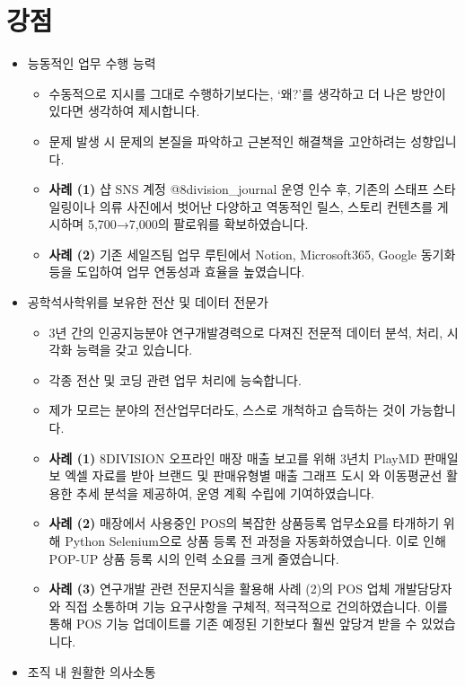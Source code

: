 \documentclass[a4paper,10pt]{extarticle}
\begin{document}
\section*{강점}
\begin{itemize}
	\item 능동적인 업무 수행 능력
	      \begin{itemize}
		      \item 수동적으로 지시를 그대로 수행하기보다는, ‘왜?’를 생각하고 더 나은 방안이 있다면 생각하여 제시합니다.
		      \item 문제 발생 시 문제의 본질을 파악하고 근본적인 해결책을 고안하려는 성향입니다.
		      \item \textbf{사례 (1)} 샵 SNS 계정 @8division\_journal 운영 인수 후, 기존의 스태프 스타일링이나 의류 사진에서 벗어난 다양하고 역동적인 릴스, 스토리 컨텐츠를 게시하며 5,700→7,000의 팔로워를 확보하였습니다.
		      \item \textbf{사례 (2)} 기존 세일즈팀 업무 루틴에서 Notion, Microsoft365, Google 동기화 등을 도입하여 업무 연동성과 효율을 높였습니다.
	      \end{itemize}
	\item 공학석사학위를 보유한 전산 및 데이터 전문가
	      \begin{itemize}
		      \item 3년 간의 인공지능분야 연구개발경력으로 다져진 전문적 데이터 분석, 처리, 시각화 능력을 갖고 있습니다.
		      \item 각종 전산 및 코딩 관련 업무 처리에 능숙합니다.
		      \item 제가 모르는 분야의 전산업무더라도, 스스로 개척하고 습득하는 것이 가능합니다.
		      \item \textbf{사례 (1)} 8DIVISION 오프라인 매장 매출 보고를 위해 3년치 PlayMD 판매일보 엑셀 자료를  받아 브랜드 및 판매유형별 매출 그래프 도시 와 이동평균선 활용한 추세 분석을 제공하여, 운영 계획 수립에 기여하였습니다.
		      \item \textbf{사례 (2)} 매장에서 사용중인 POS의 복잡한 상품등록 업무소요를 타개하기 위해 Python Selenium으로 상품 등록 전 과정을 자동화하였습니다. 이로 인해 POP-UP 상품 등록 시의 인력 소요를 크게 줄였습니다.
		      \item \textbf{사례 (3)} 연구개발 관련 전문지식을 활용해 사례 (2)의 POS 업체 개발담당자와 직접 소통하며 기능 요구사항을 구체적, 적극적으로 건의하였습니다. 이를 통해 POS 기능 업데이트를 기존 예정된 기한보다 훨씬 앞당겨 받을 수 있었습니다.
	      \end{itemize}
	\item 조직 내 원활한 의사소통

\end{itemize}
\end{document}
